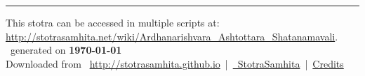 \documentclass[oneside,12pt]{book}
\begin{document}
\setmainfont[Script=Devanagari,Mapping=tex-text]{Sanskrit 2003}
\fontsize {16}{19.25}\selectfont
\begin{center}

\end{center}
\vfill
\centering
\rule{0.8\textwidth}{0.6pt}

\footnotesize
{}\sffamily
This stotra can be accessed in multiple scripts at:\\
\url{http://stotrasamhita.net/wiki/Ardhanarishvara_Ashtottara_Shatanamavali}.\\[1ex]
\faFilePdfO~generated on \textbf{\today}\\[1ex]
Downloaded from \faGlobe{}~\url{http://stotrasamhita.github.io}~|~\href{https://github.com/StotraSamhita}{\faGithubSquare{}~StotraSamhita}~|~\href{https://stotrasamhita.github.io/about/}{Credits}
\end{document}
